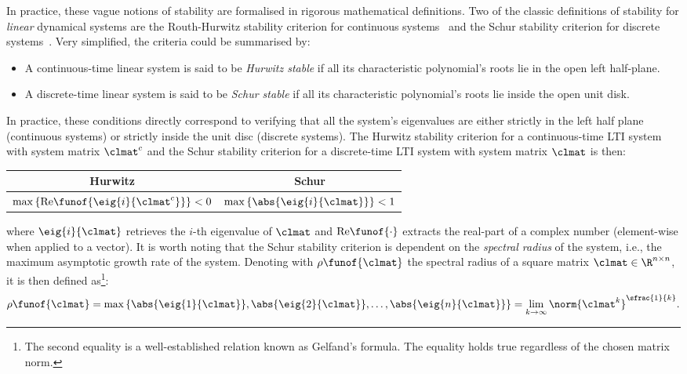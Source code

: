 In practice, these vague notions of stability are formalised in rigorous mathematical definitions.
Two of the classic definitions of stability for \emph{linear} dynamical systems are the Routh-Hurwitz stability criterion for continuous systems~\addref{} and the Schur stability criterion for discrete systems~\addref{}.
Very simplified, the criteria could be summarised by:
%
\begin{itemize}
    \item A continuous-time linear system is said to be \emph{Hurwitz stable} if all its characteristic polynomial's roots lie in the open left half-plane.
    \item A discrete-time linear system is said to be \emph{Schur stable} if all its characteristic polynomial's roots lie inside the open unit disk.
\end{itemize}
%
In practice, these conditions directly correspond to verifying that all the system's eigenvalues are either strictly in the left half plane (continuous systems) or strictly inside the unit disc (discrete systems).
The Hurwitz stability criterion for a continuous-time LTI system with system matrix $\clmat^c$ and the Schur stability criterion for a discrete-time LTI system with system matrix $\clmat$ is then:
%
\begin{table}[h]
    \def\arraystretch{1.5}%
    \centering%
    \begin{tabular}{c|c}
        Hurwitz & Schur \\ \hline
        $\max{ \left\{ \mathrm{Re}\funof{\eig{i}{\clmat^c}} \right\}} < 0$ & $\max{ \left\{ \abs{\eig{i}{\clmat}} \right\}} < 1$
    \end{tabular}
\end{table}
%
\newline\noindent
where $\eig{i}{\clmat}$ retrieves the $i$-th eigenvalue of $\clmat$ and $\mathrm{Re}\funof{\cdot}$ extracts the real-part of a complex number (element-wise when applied to a vector).
It is worth noting that the Schur stability criterion is dependent on the \emph{spectral radius} of the system, i.e., the maximum asymptotic growth rate of the system.
Denoting with $\rho\funof{\clmat}$ the spectral radius of a square matrix $\clmat \in \R^{n \times n}$, it is then defined as\footnote{The second equality is a well-established relation known as Gelfand's formula. The equality holds true regardless of the chosen matrix norm.}:
%
\begin{equation}%
    \label{eq:spectral-radius}%
    \rho\funof{\clmat} = \max \left\{ \abs{\eig{1}{\clmat}}, \abs{\eig{2}{\clmat}}, \ldots, \abs{\eig{n}{\clmat}} \right\} = \lim_{k\rightarrow\infty} \norm{\clmat^k}^{\sfrac{1}{k}}.
\end{equation}

